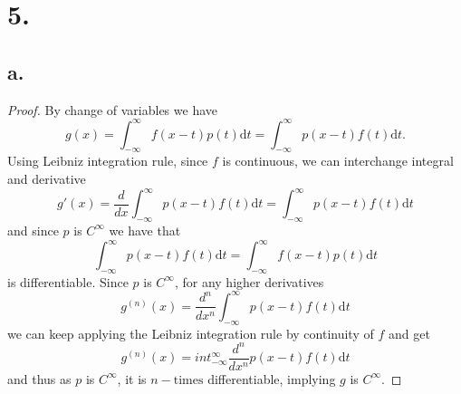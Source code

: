 \documentclass{article}
\begin{document}
\section*{5.}
\subsection*{a.}
\begin{proof}
  By change of variables we have \[
  g(x) = \int_{-\infty}^{\infty}f(x - t)p(t)\mathrm{d}t = \int_{-\infty}^{\infty}p(x - t)f(t) \mathrm{d}t.  
  \]
  Using Leibniz integration rule, since $f$ is continuous, we can interchange integral and derivative
  \[
  g'(x) = \frac{d}{dx}\int_{-\infty}^{\infty}p(x - t)f(t) \mathrm{d}t = \int_{-\infty}^{\infty}p(x - t)f(t) \mathrm{d}t  
  \]
  and since $p$ is $C^{\infty}$ we have that 
  \[
  \int_{-\infty}^{\infty}p(x - t)f(t)\mathrm{d}t = \int_{-\infty}^{\infty}f(x - t)p(t)\mathrm{d}t  
  \]
  is differentiable. Since $p$ is $C^{\infty}$, for any higher derivatives
  \[
  g^{(n)}(x) = \frac{d^n}{dx^n} \int_{-\infty}^{\infty}p(x - t)f(t)\mathrm{d}t  
  \]
  we can keep applying the Leibniz integration rule by continuity of $f$ and get 
  \[
  g^{(n)}(x) = 
  int_{-\infty}^{\infty}\frac{d^n}{dx^n}p(x - t)f(t)\mathrm{d}t  
  \]
  and thus as $p$ is $C^{\infty}$, it is $n-\text{times}$ differentiable, implying $g$ is $C^{\infty}$. 
\end{proof}
\end{document}
